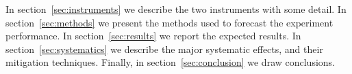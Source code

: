 In section~\ref{sec:instruments} we describe the two instruments with some detail. 
In section~\ref{sec:methods} we present the methods used to forecast the experiment
performance. 
In section~\ref{sec:results} we report the expected results. 
In section~\ref{sec:systematics} we describe the major systematic effects, and their 
mitigation techniques. 
Finally, in section~\ref{sec:conclusion} we draw conclusions. 
